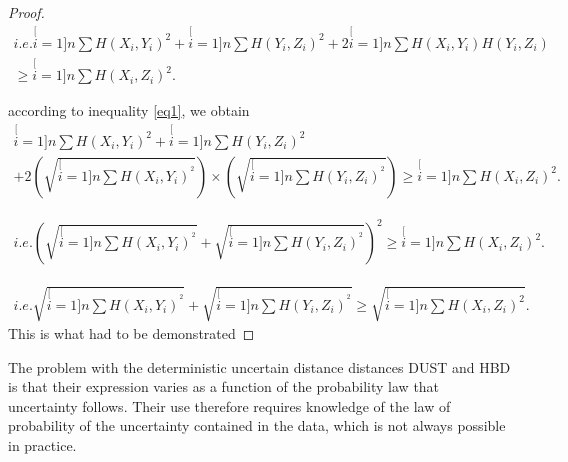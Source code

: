\begin{proof}
\begin{eqnarray}
i.e.
\stackrel[i=1]{n}{\sum}H(X_{i},Y_{i})^2+\stackrel[i=1]{n}{\sum}H(Y_{i},Z_{i})^2
+ 2\stackrel[i=1]{n}{\sum}H(X_i, Y_i)H(Y_i, Z_i) \\ \geq
\stackrel[i=1]{n}{\sum}H(X_{i},Z_{i})^2.
\end{eqnarray}

according to inequality \ref{eq1}, we obtain
\begin{eqnarray}
\stackrel[i=1]{n}{\sum}H(X_{i},Y_{i})^2+\stackrel[i=1]{n}{\sum}H(Y_{i},Z_{i})^2 \\
+ 2\left( \sqrt{\stackrel[i=1]{n}{\sum}H(X_{i},Y_{i})^{^{2}} }\right)
\times
\left( \sqrt{\stackrel[i=1]{n}{\sum}H(Y_{i},Z_{i})^{^{2}}} \right)
\geq
\stackrel[i=1]{n}{\sum}H(X_{i},Z_{i})^2.
\end{eqnarray}

\begin{eqnarray}
i.e.
\left( \sqrt{\stackrel[i=1]{n}{\sum}H(X_{i},Y_{i})^{^{2}} }
+
\sqrt{\stackrel[i=1]{n}{\sum}H(Y_{i},Z_{i})^{^{2}}} \right)^2
\geq
\stackrel[i=1]{n}{\sum}H(X_{i},Z_{i})^2.
\end{eqnarray}

\begin{eqnarray}
i.e.
 \sqrt{\stackrel[i=1]{n}{\sum}H(X_{i},Y_{i})^{^{2}} }
+
\sqrt{\stackrel[i=1]{n}{\sum}H(Y_{i},Z_{i})^{^{2}}}
\geq
\sqrt{\stackrel[i=1]{n}{\sum}H(X_{i},Z_{i})^2}.
\end{eqnarray}
This is what had to be demonstrated
\end{proof}

The problem with the deterministic uncertain distance distances DUST and HBD is that their expression varies as a function of the probability law that uncertainty follows. Their use therefore requires knowledge of the law of probability of the uncertainty 
contained in the data, which is not always possible in practice.






































